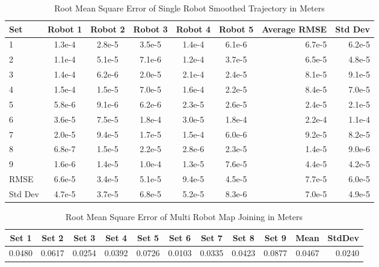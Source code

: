 \documentclass[12pt]{report}
\begin{document}
\begin{center}
\begin{table}[h]
  \caption{Root Mean Square Error of Single Robot Smoothed Trajectory in Meters}
  \begin{tabular}{| l | c | c | c | c | c || r ||r |}
    \hline
     Set & Robot 1 & Robot 2 & Robot 3 & Robot 4 & Robot 5 & Average RMSE & Std Dev \\ \hline \hline
	 1 & 1.3e-4 & 2.8e-5 & 3.5e-5 & 1.4e-4 & 6.1e-6 & 6.7e-5 & 6.2e-5\\ \hline
     2 & 1.1e-4 & 5.1e-5 & 7.1e-6 & 1.2e-4 & 3.7e-5 & 6.5e-5 & 4.8e-5\\ \hline
     3 & 1.4e-4 & 6.2e-6 & 2.0e-5 & 2.1e-4 & 2.4e-5 & 8.1e-5 & 9.1e-5\\ \hline
     4 & 1.5e-4 & 1.5e-5 & 7.0e-5 & 1.6e-4 & 2.2e-5 & 8.4e-5 & 7.0e-5\\ \hline
     5 & 5.8e-6 & 9.1e-6 & 6.2e-6 & 2.3e-5 & 2.6e-5 & 2.4e-5 & 2.1e-5\\ \hline
     6 & 3.6e-5 & 7.5e-5 & 1.8e-4 & 3.0e-5 & 1.8e-4 & 2.2e-4 & 1.1e-4\\ \hline
     7 & 2.0e-5 & 9.4e-5 & 1.7e-5 & 1.5e-4 & 6.0e-6 & 9.2e-5 & 8.2e-5\\ \hline
     8 & 6.8e-7 & 1.5e-5 & 2.2e-5 & 2.8e-6 & 2.3e-5 & 1.4e-5 & 9.0e-6\\ \hline
     9 & 1.6e-6 & 1.4e-5 & 1.0e-4 & 1.3e-5 & 7.6e-5 & 4.4e-5 & 4.2e-5\\ \hline
    \hline
    RMSE & 6.6e-5 & 3.4e-5 & 5.1e-5 & 9.4e-5 & 4.5e-5 & 7.7e-5 & 6.0e-5\\ \hline
    Std Dev & 4.7e-5 & 3.7e-5 & 6.8e-5 & 5.2e-5 & 8.3e-6 & 7.0e-5 & 4.9e-5\\ \hline
    \hline	
  \end{tabular}
  \end{table}
\end{center}

\begin{center}
\begin{table}[h]
  \caption{Root Mean Square Error of Multi Robot Map Joining in Meters}
  \begin{tabular}{| c | c | c | c | c | c | c | c | c || r ||r |}
    \hline
     Set 1 & Set 2 & Set 3 & Set 4 & Set 5 & Set 6  & Set 7  & Set 8 & Set 9 & Mean & StdDev \\ \hline \hline
     0.0480 & 0.0617 & 0.0254 & 0.0392 & 0.0726 &  0.0103 &  0.0335 & 0.0423 & 0.0877 & 0.0467 & 0.0240\\ \hline
    \hline	
  \end{tabular}
  \end{table}
\end{center}
\end{document}
